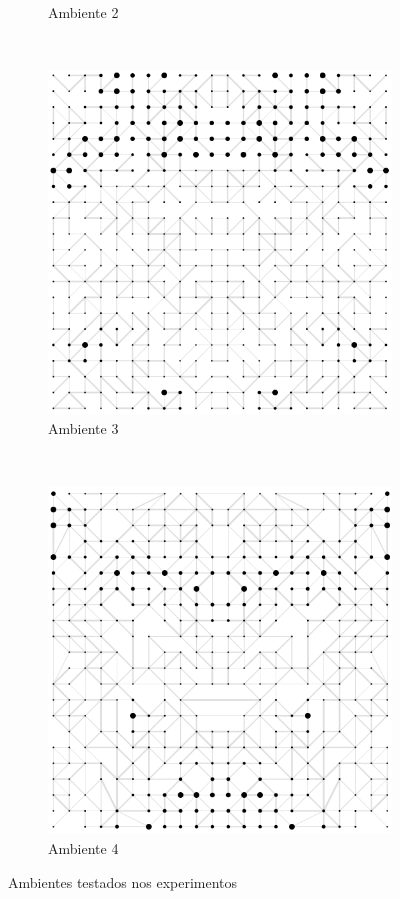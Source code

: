 \documentclass{llncs}
\begin{document}
\begin{figure}[!ht]
\begin{subfigure}[b]{0.48\textwidth}
              \caption{Ambiente 2}
              \label{fig:ambiente2}
      \end{subfigure}
      ~
      \begin{subfigure}[b]{0.48\textwidth}
              \includegraphics[width=\textwidth]{images/sim3.png}
              \caption{Ambiente 3}
              \label{fig:ambiente3}
      \end{subfigure}
      ~
      \begin{subfigure}[b]{0.48\textwidth}
              \includegraphics[width=\textwidth]{images/sim4.png}
              \caption{Ambiente 4}
              \label{fig:ambiente4}
      \end{subfigure}
      \caption{Ambientes testados nos experimentos}
      \label{fig:ambientes-testes}
\end{figure}
\end{document}
